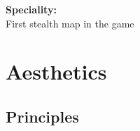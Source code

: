 \documentclass[10pt,a4paper]{article}
\begin{document}
\begin{center}
\textbf{Speciality:}\\
First stealth map in the game
\end{center}
\section{Aesthetics}
\subsection{Principles}
\end{document}
